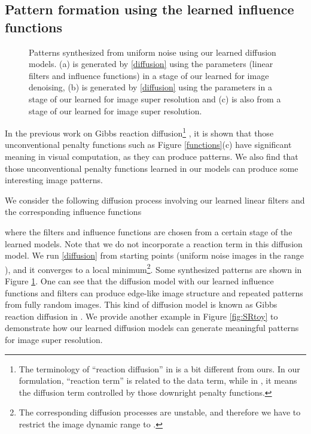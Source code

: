 \documentclass[10pt,journal,compsoc]{IEEEtran}
\begin{document}
\subsection{Pattern formation using the learned influence 
functions}\label{sec:patterns}
\begin{figure}[t!]
\centering
{}\hfill
{}\hfill
{}
\vspace*{-0.25cm}
\caption{Patterns synthesized from uniform noise 
using our learned diffusion models. (a) is generated by \eqref{diffusion} using 
the parameters (linear filters and influence functions) in a stage of our learned  
for image denoising, (b) is generated by \eqref{diffusion} using 
the parameters in a stage of our learned  for image super resolution and 
(c) is also from a stage of our learned  for image super resolution.}\label{patterns}
\vspace*{-0.5cm}
\end{figure}

In the previous work on Gibbs reaction diffusion\footnote{The terminology of ``reaction diffusion'' in \cite{zhu1997prior} is a bit 
different from ours. In our formulation, ``reaction term'' is related to the data term, while in \cite{zhu1997prior}, it means 
the diffusion term controlled by those downright penalty functions.} 
\cite{zhu1997prior}, it is shown that those unconventional penalty functions 
such as Figure \ref{functions}(c) have significant meaning in visual computation, as they can produce patterns. 
We also find that those unconventional penalty functions learned in our models 
can produce some interesting image patterns. 

We consider the following diffusion process involving our learned linear filters and the corresponding influence functions

where the filters  and influence functions  are chosen from a certain stage of the learned models. Note that we 
do not incorporate a reaction term in this diffusion model. We run \eqref{diffusion} 
from starting points  (uniform 
noise images in the range ), and it converges to a local minimum\footnote{The corresponding diffusion processes are 
unstable, and therefore we have to restrict the image dynamic range to .}. Some synthesized patterns are 
shown in Figure \ref{patterns}. One can see that the diffusion model with our learned influence functions and filters can 
produce edge-like image structure and repeated patterns from fully random images. 
This kind of diffusion model is known as Gibbs reaction diffusion in \cite{zhu1997prior}. 
We provide another example in Figure \ref{fig:SRtoy} 
to demonstrate how our learned diffusion models can generate meaningful patterns for image super resolution. 
\end{document}

